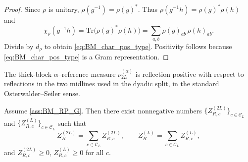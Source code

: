 \begin{proof}
Since $\rho$ is unitary, $\rho(g^{-1})=\rho(g)^\ast$.
Thus $\rho(g^{-1}h)=\rho(g)^\ast\rho(h)$ and
\[
\chi_\rho(g^{-1}h)=\mathrm{Tr}\big(\rho(g)^\ast\rho(h)\big)=\sum_{a,b}\overline{\rho(g)_{ab}}\,\rho(h)_{ab}.
\]
Divide by $d_\rho$ to obtain \eqref{eq:BM_char_pos_type}. Positivity follows because \eqref{eq:BM_char_pos_type} is a Gram representation.
\end{proof}

\begin{proposition}\label{ass:BM_RP_G}
The thick-block $\alpha$--reference measure $\nu_{2L}^{(\alpha)}$ is reflection positive with respect to reflections in the two midlines
used in the dyadic split, in the standard Osterwalder--Seiler sense.
\end{proposition}

\begin{lemma}\label{lem:BM_channel_decomp_G}
Assume \ref{ass:BM_RP_G}. Then there exist nonnegative numbers $\{Z^{(2L)}_{R,c}\}_{c\in\mathcal C_L}$ and
$\{Z^{(L)}_{R,c}\}_{c\in\mathcal C_L}$ such that
\[
Z^{(2L)}_{R}=\sum_{c\in\mathcal C_L} Z^{(2L)}_{R,c},\qquad
Z^{(L)}_{R}=\sum_{c\in\mathcal C_L} Z^{(L)}_{R,c},
\]
and $Z^{(2L)}_{R,c}\ge 0$, $Z^{(L)}_{R,c}\ge 0$ for all $c$.
\end{lemma}

